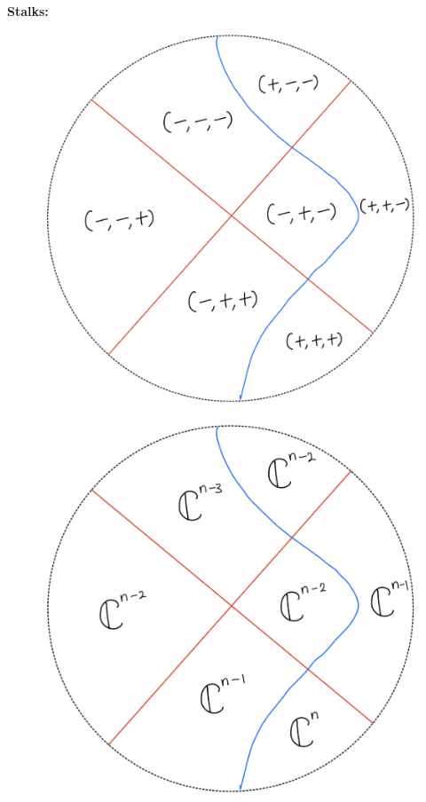 \textbf{Stalks:}
\begin{figure}[H]
    \centering
    \includegraphics[scale = 0.95]{diagrams/lemma4/22.png}
    \caption{}
    \label{fig:your-label}
\end{figure}
\begin{figure}[H]
    \centering
    \includegraphics[scale = 0.95]{diagrams/cobord'4/23.png}
    \caption{}
    \label{fig:your-label}
\end{figure}
